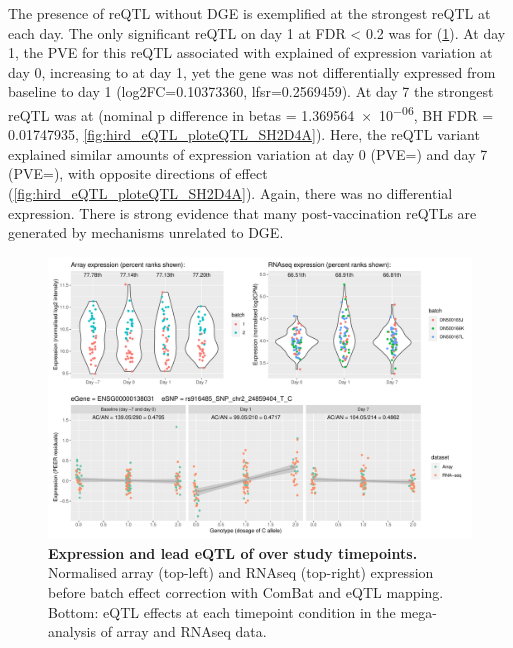 The presence of \gls{reQTL} without \gls{DGE} is exemplified at the strongest
\gls{reQTL} at each day.
The only significant \gls{reQTL} on day 1 at FDR < 0.2 was for  (\cref{fig:hird_eQTL_ploteQTL_ADCY3}).
At day 1, the \gls{PVE} for this \gls{reQTL} associated with  explained  of expression variation at day 0, increasing to  at day 1,
yet the gene was not differentially expressed from baseline to day 1 (log2FC=\num{0.10373360}, lfsr=\num{0.2569459}).
%
At day 7 the strongest \gls{reQTL} was at  (nominal p difference in betas = \num{1.369564e-06}, BH FDR = \num{0.01747935}, \cref{fig:hird_eQTL_ploteQTL_SH2D4A}).
Here, the \gls{reQTL} variant explained similar amounts of expression variation at day 0 (\gls{PVE}=) and day 7 (\gls{PVE}=), with opposite directions of effect (\cref{fig:hird_eQTL_ploteQTL_SH2D4A}).
Again, there was no differential expression.
There is strong evidence that many post-vaccination \glspl{reQTL} are generated by mechanisms unrelated to \gls{DGE}.

\begin{figure}
    \centering
    \includegraphics[width=1.0\textwidth,page=1]{mainmatter/figures/chapter_03/plot_dge_eqtl_genotypes.ENSG00000138031,rs916485_SNP_chr2_24859404_T_C.pdf}
    \caption{
        \textbf{Expression and lead \gls{eQTL} of  over study timepoints.}
        Normalised array (top-left) and \gls{RNAseq} (top-right) expression before batch effect correction with ComBat and \gls{eQTL} mapping. 
        Bottom: \gls{eQTL} effects at each timepoint condition in the mega-analysis of array and \gls{RNAseq} data.
    }
    \label{fig:hird_eQTL_ploteQTL_ADCY3}
\end{figure}

